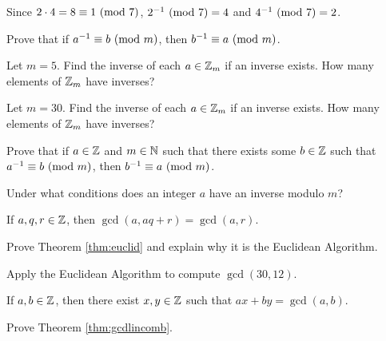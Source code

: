 \begin{example}
	Since $2\cdot4 = 8\equiv 1\mbox{\ $\left(\mathrm{mod}\ {7}\right)$}$, $2^{-1}\mbox{\ $\left(\mathrm{mod}\ {7}\right)$} = 4$ and $4^{-1}\mbox{\ $\left(\mathrm{mod}\ {7}\right)$} = 2$.
\end{example}

\begin{problem} [10 points]
Prove that if $a^{-1}\equiv b\mbox{\ $\left(\mathrm{mod}\ {m}\right)$}$, then $b^{-1}\equiv a\mbox{\ $\left(\mathrm{mod}\ {m}\right)$}$.
\end{problem}

\begin{problem} [10 points]
	Let $m=5$. Find the inverse of each $a\in\mathbb{Z}_m$ if an inverse exists. How many elements of $\mathbb{Z}_m$ have inverses?
\end{problem}

\begin{problem} [10 points]
	Let $m=30$. Find the inverse of each $a\in\mathbb{Z}_m$ if an inverse exists. How many elements of $\mathbb{Z}_m$ have inverses?
\end{problem}

\begin{problem} [10 points]
Prove that if $a\in\mathbb{Z}$ and $m\in\mathbb{N}$ such that there exists some $b\in\mathbb{Z}$ such that $a^{-1}\equiv b\mbox{\ $\left(\mathrm{mod}\ {m}\right)$}$, then $b^{-1}\equiv a\mbox{\ $\left(\mathrm{mod}\ {m}\right)$}$.
\end{problem}

\begin{problem} [10 points]
Under what conditions does an integer $a$ have an inverse modulo $m$?
\end{problem}

\begin{theorem}
\label{thm:euclid}
If $a, q, r\in\mathbb{Z}$, then $\gcd(a, aq+r)=\gcd(a,r)$.
\end{theorem}

\begin{problem} [15 points]
Prove Theorem \ref{thm:euclid} and explain why it is the Euclidean Algorithm.
\end{problem}

\begin{problem}
 [10 points]
Apply the Euclidean Algorithm to compute $\gcd(30, 12)$.
\end{problem}

\begin{theorem}
\label{thm:gcdlincomb}
If $a,b\in\mathbb{Z}$, then there exist $x, y\in\mathbb{Z}$ such that $ax+by=\gcd(a,b)$.
\end{theorem}

\begin{problem} [15 points]
Prove Theorem \ref{thm:gcdlincomb}.
\end{problem}

